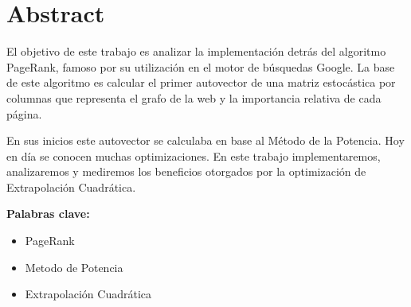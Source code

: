 \section{Abstract}

El objetivo de este trabajo es analizar la implementación detrás del algoritmo
PageRank, famoso por su utilización en el motor de búsquedas Google. La base de
este algoritmo es calcular el primer autovector de una matriz estocástica por
columnas que representa el grafo de la web y la importancia relativa de cada
página.

En sus inicios este autovector se calculaba en base al Método de la Potencia.
Hoy en día se conocen muchas optimizaciones. En este trabajo implementaremos,
analizaremos y mediremos los beneficios otorgados por la optimización de
Extrapolación Cuadrática.

{\bf Palabras clave:}
\begin{itemize} 
    \item PageRank
    \item Metodo de Potencia
    \item Extrapolación Cuadrática
\end{itemize}
